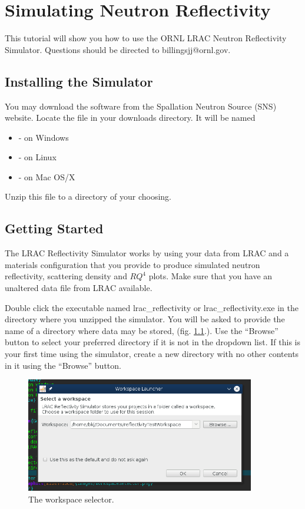 \chapter{Simulating Neutron Reflectivity}

This tutorial will show you how to use the ORNL LRAC Neutron Reflectivity
Simulator. Questions should be directed to billingsjj@ornl.gov.

\section{Installing the Simulator}

You may download the software from the Spallation Neutron Source (SNS) website.
Locate the file in your downloads directory. It will be named
\begin{itemize}
  \item - on Windows
  \item - on Linux
  \item - on Mac OS/X
\end{itemize}

Unzip this file to a directory of your choosing. 

\section{Getting Started}

The LRAC Reflectivity Simulator works by using your data from LRAC and a
materials configuration that you provide to produce simulated
neutron reflectivity, scattering density and $RQ^4$ plots. Make sure that you
have an unaltered data file from LRAC available.

Double click the executable named lrac\_reflectivity or lrac\_reflectivity.exe
in the directory where you unzipped the simulator. You will be asked to provide the
name of a directory where data may be stored, (fig. \ref{workspace}.). Use the
``Browse'' button to select your preferred directory if it is not in the dropdown list. If
this is your first time using the simulator, create a new directory with no
other contents in it using the ``Browse'' button.

\begin{figure}[!h]
\centering
\includegraphics[width=10cm]{images/workspaceSelector.png}
\caption{The workspace selector.}
\label{workspace}
\end{figure}

